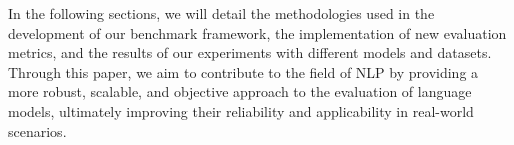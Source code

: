 In the following sections, we will detail the methodologies used in the development of our benchmark framework, the implementation of new evaluation metrics, and the results of our experiments with different models and datasets. Through this paper, we aim to contribute to the field of NLP by providing a more robust, scalable, and objective approach to the evaluation of language models, ultimately improving their reliability and applicability in real-world scenarios.